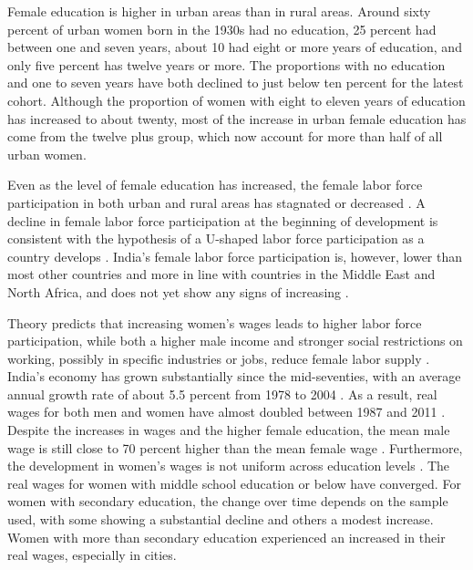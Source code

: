 \documentclass[12pt,letterpaper]{article}
\begin{document}
Female education is higher in urban areas than in rural areas.
Around sixty percent of urban women born in the 1930s had no education, 25 percent had
between one and seven years, about 10 had eight or more years of education, and only
five percent has twelve years or more.
The proportions with no education and one to seven years have both declined to just below 
ten percent for the latest cohort.
Although the proportion of women with eight to eleven years of education has increased
to about twenty, most of the increase in urban female education has come from the 
twelve plus group, which now account for more than half of all urban women.

Even as the level of female education has increased, the female labor force participation 
in both urban and rural areas has stagnated or decreased
\citep{Klasen2015,Afridi2018,Bhargava2018,Chatterjee2018, Bhargava2019}.
A decline in female labor force participation at the beginning of development is
consistent with the hypothesis of a U-shaped labor force participation as a country
develops \citep{Goldin1994}.
India's female labor force participation is, however, lower than most other
countries and more in line with countries in the Middle East and North Africa, and
does not yet show any signs of increasing
\citep{Klasen2015,Chatterjee2018}.

Theory predicts that increasing women's wages leads to higher labor force participation, 
while both a higher male income and stronger social restrictions on working, possibly in 
specific industries or jobs, reduce female labor supply \citep{Goldin1994}.
India's economy has grown substantially since the mid-seventies, with
an average annual growth rate of about 5.5 percent from 1978 to 2004 \citet{Bosworth2008}.
As a result, real wages for both men and women have almost doubled between 1987 and 2011 
\citep{Klasen2015}.
Despite the increases in wages and the higher female education, the mean male wage is
still close to 70 percent higher than the mean female wage \citep{Bhargava2018}.
Furthermore, the development in women's wages is not uniform across education 
levels \citep{Klasen2015,Bhargava2018}.
The real wages for women with middle school education or below have converged. 
For women with secondary education, the change over time depends on the sample used,
with some showing a substantial decline and others a modest increase.
Women with more than secondary education experienced an increased in their real 
wages, especially in cities.
\end{document}

